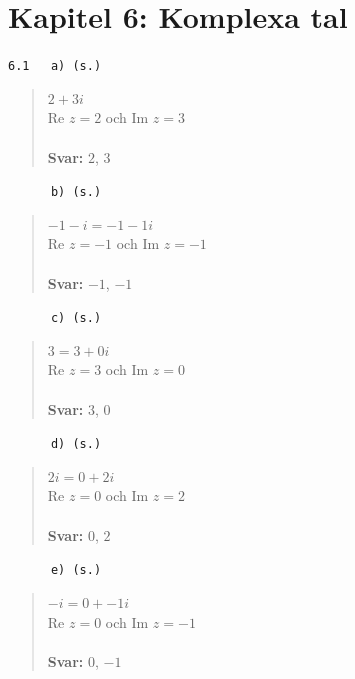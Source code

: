 \documentclass[a4paper]{article}
\newcommand{\tskcol}[1]{\textcolor{tskcol}{#1}}
\begin{document}
	\pagebreak
	\section*{Kapitel 6: Komplexa tal}
	
	\texttt{\tskcol{6.1~~~a) (s.)}}
	\begin{quotation}
		\noindent
		$2+3i$ \\
		Re $z = 2$ och Im $z = 3$
		\\ \\
		\textbf{Svar:} $2$, $3$
	\end{quotation}
	
	\texttt{\tskcol{~~~~~~b) (s.)}}
	\begin{quotation}
		\noindent
		$-1-i=-1-1i$ \\
		Re $z = -1$ och Im $z = -1$
		\\ \\
		\textbf{Svar:} $-1$, $-1$
	\end{quotation}
	
	\texttt{\tskcol{~~~~~~c) (s.)}}
	\begin{quotation}
		\noindent
		$3=3+0i$ \\
		Re $z = 3$ och Im $z = 0$
		\\ \\
		\textbf{Svar:} $3$, $0$
	\end{quotation}
	
	\texttt{\tskcol{~~~~~~d) (s.)}}
	\begin{quotation}
		\noindent
		$2i=0+2i$ \\
		Re $z = 0$ och Im $z = 2$
		\\ \\
		\textbf{Svar:} $0$, $2$
	\end{quotation}
	
	\texttt{\tskcol{~~~~~~e) (s.)}}
	\begin{quotation}
		\noindent
		$-i=0+-1i$ \\
		Re $z = 0$ och Im $z = -1$
		\\ \\
		\textbf{Svar:} $0$, $-1$
	\end{quotation}
	
\end{document}
